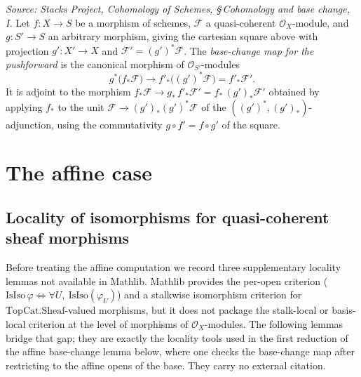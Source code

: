 \begin{definition}
  \label{def:pushforward_base_change_map}
  \textit{Source: Stacks Project, Cohomology of Schemes, \S\,Cohomology and base
  change, I.}
  Let \(f : X \to S\) be a morphism of schemes, \(\mathcal{F}\) a quasi-coherent
  \(\mathcal{O}_X\)-module, and \(g : S' \to S\) an arbitrary morphism, giving the
  cartesian square above with projection \(g' : X' \to X\) and
  \(\mathcal{F}' = (g')^*\mathcal{F}\). The \emph{base-change map for the
  pushforward} is the canonical morphism of \(\mathcal{O}_{S'}\)-modules
  \[
    g^*\bigl(f_*\mathcal{F}\bigr) \longrightarrow f'_*\bigl((g')^*\mathcal{F}\bigr)
    = f'_*\mathcal{F}' .
  \]
  It is adjoint to the morphism
  \(f_*\mathcal{F} \to g_*\, f'_*\mathcal{F}' = f_*\,(g')_*\mathcal{F}'\) obtained
  by applying \(f_*\) to the unit
  \(\mathcal{F} \to (g')_*(g')^*\mathcal{F}\) of the
  \(((g')^*, (g')_*)\)-adjunction, using the commutativity
  \(g \circ f' = f \circ g'\) of the square.
\end{definition}

\section{The affine case}

\subsection{Locality of isomorphisms for quasi-coherent sheaf morphisms}

Before treating the affine computation we record three supplementary locality
lemmas not available in Mathlib. Mathlib provides the per-open criterion
(\(\mathrm{IsIso}\,\varphi \iff \forall U,\ \mathrm{IsIso}(\varphi_U)\)) and a
stalkwise isomorphism criterion for \(\mathrm{TopCat.Sheaf}\)-valued morphisms, but
it does not package the stalk-local or basis-local criterion at the level of
morphisms of \(\mathcal{O}_X\)-modules. The following lemmas bridge that gap; they
are exactly the locality tools used in the first reduction of the affine
base-change lemma below, where one checks the base-change map after restricting to
the affine opens of the base. They carry no external citation.

